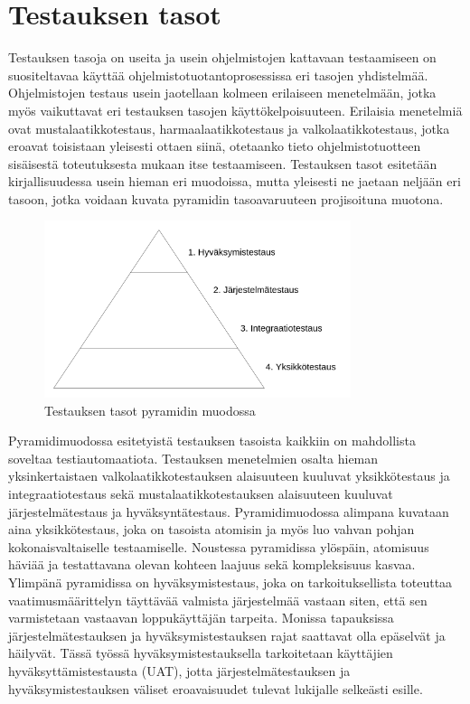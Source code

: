 \section{Testauksen tasot} \label{ch:07_testauksen_tasot}

  Testauksen tasoja on useita ja usein ohjelmistojen kattavaan testaamiseen on suositeltavaa käyttää ohjelmistotuotantoprosessissa eri tasojen yhdistelmää.
  Ohjelmistojen testaus usein jaotellaan kolmeen erilaiseen menetelmään, jotka myös vaikuttavat eri testauksen tasojen käyttökelpoisuuteen.
  Erilaisia menetelmiä ovat mustalaatikkotestaus, harmaalaatikkotestaus ja valkolaatikkotestaus, jotka eroavat toisistaan yleisesti ottaen siinä, otetaanko tieto ohjelmistotuotteen sisäisestä toteutuksesta mukaan itse testaamiseen.
  Testauksen tasot esitetään kirjallisuudessa usein hieman eri muodoissa, mutta yleisesti ne jaetaan neljään eri tasoon, jotka voidaan kuvata pyramidin tasoavaruuteen projisoituna muotona.

  \begin{figure}[H]
    \centering
    \includegraphics[width=0.8\textwidth]{assets/testing-levels-pyramid.png}
    \caption{Testauksen tasot pyramidin muodossa}
    \label{fig:testing-levels-pyramid}
  \end{figure}

  Pyramidimuodossa esitetyistä testauksen tasoista kaikkiin on mahdollista soveltaa testiautomaatiota.
  Testauksen menetelmien osalta hieman yksinkertaistaen valkolaatikkotestauksen alaisuuteen kuuluvat yksikkötestaus ja integraatiotestaus sekä mustalaatikkotestauksen alaisuuteen kuuluvat järjestelmätestaus ja hyväksyntätestaus.
  Pyramidimuodossa alimpana kuvataan aina yksikkötestaus, joka on tasoista atomisin ja myös luo vahvan pohjan kokonaisvaltaiselle testaamiselle.
  Noustessa pyramidissa ylöspäin, atomisuus häviää ja testattavana olevan kohteen laajuus sekä kompleksisuus kasvaa.
  Ylimpänä pyramidissa on hyväksymistestaus, joka on tarkoituksellista toteuttaa vaatimusmäärittelyn täyttävää valmista järjestelmää vastaan siten, että sen varmistetaan vastaavan loppukäyttäjän tarpeita.
  Monissa tapauksissa järjestelmätestauksen ja hyväksymistestauksen rajat saattavat olla epäselvät ja häilyvät.
  Tässä työssä hyväksymistestauksella tarkoitetaan käyttäjien hyväksyttämistestausta (UAT), jotta järjestelmätestauksen ja hyväksymistestauksen väliset eroavaisuudet tulevat lukijalle selkeästi esille.

